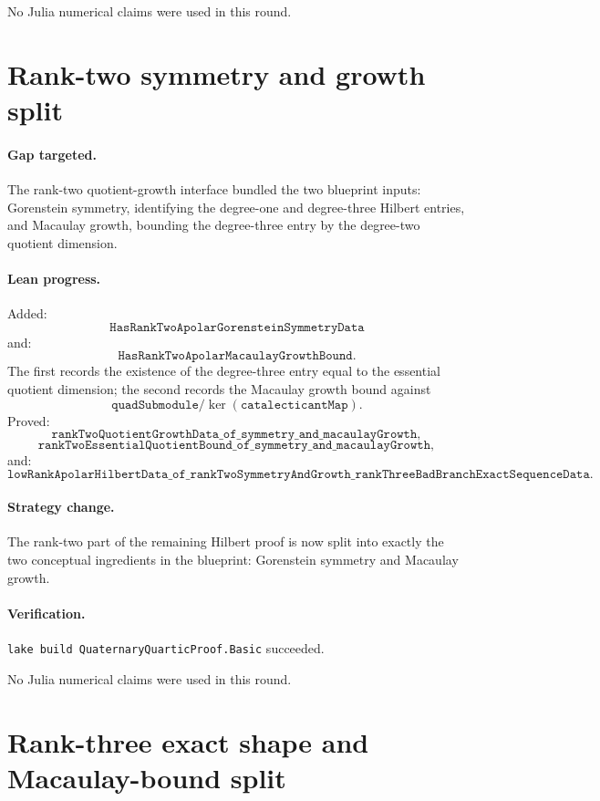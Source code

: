 \documentclass[11pt]{article}
\begin{document}
No Julia numerical claims were used in this round.

\section*{Rank-two symmetry and growth split}

\paragraph{Gap targeted.}
The rank-two quotient-growth interface bundled the two blueprint inputs:
Gorenstein symmetry, identifying the degree-one and degree-three Hilbert
entries, and Macaulay growth, bounding the degree-three entry by the
degree-two quotient dimension.

\paragraph{Lean progress.}
Added:
\[
\texttt{HasRankTwoApolarGorensteinSymmetryData}
\]
and:
\[
\texttt{HasRankTwoApolarMacaulayGrowthBound}.
\]
The first records the existence of the degree-three entry equal to the
essential quotient dimension; the second records the Macaulay growth bound
against
\[
\texttt{quadSubmodule}/\ker(\texttt{catalecticantMap}).
\]
Proved:
\[
\texttt{rankTwoQuotientGrowthData\_of\_symmetry\_and\_macaulayGrowth},
\]
\[
\texttt{rankTwoEssentialQuotientBound\_of\_symmetry\_and\_macaulayGrowth},
\]
and:
\[
\texttt{lowRankApolarHilbertData\_of\_rankTwoSymmetryAndGrowth\_rankThreeBadBranchExactSequenceData}.
\]

\paragraph{Strategy change.}
The rank-two part of the remaining Hilbert proof is now split into exactly the
two conceptual ingredients in the blueprint: Gorenstein symmetry and Macaulay
growth.

\paragraph{Verification.}
\texttt{lake build QuaternaryQuarticProof.Basic} succeeded.

No Julia numerical claims were used in this round.

\section*{Rank-three exact shape and Macaulay-bound split}
\end{document}
